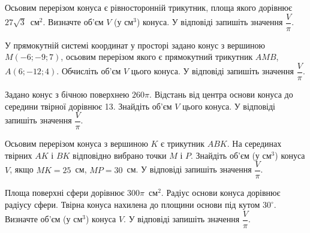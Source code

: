 \documentclass[12pt]{article}
\begin{document}
\begin{samepage}
\noindent\zadnum Осьовим перерізом конуса є рівносторонній трикутник, площа якого дорівнює $27\sqrt{3}$~см$^2$. Визначте об’єм $V$ (у см$^3$) конуса. У відповіді запишіть значення $\dfrac{V}{\pi}$. 

\nmtnobreak
\nopagebreak\nbvspace{0.5cm}
\nmtAnswerBox
\par{}
\end{samepage}

\begin{samepage}
\noindent\zadnum У прямокутній системі координат у просторі задано конус з вершиною $M(-6; -9; 7)$, осьовим перерізом якого є прямокутний трикутник $AMB$, $A(6; -12; 4)$. Обчисліть об’єм $V$ цього конуса. У відповіді запишіть значення $\dfrac{V}{\pi}$. 

\nmtnobreak
\nopagebreak\nbvspace{0.5cm}
\nmtAnswerBox
\par{}
\end{samepage}

\begin{samepage}
\noindent\zadnum Задано конус з бічною поверхнею $260\pi$. Відстань від центра основи конуса до середини твірної дорівнює 13. Знайдіть об'єм $V$ цього конуса. У відповіді запишіть значення $\dfrac{V}{\pi}$. 

\nmtnobreak
\nopagebreak\nbvspace{0.5cm}
\nmtAnswerBox
\par{}
\end{samepage}

\begin{samepage}
\noindent\zadnum Осьовим перерізом конуса з вершиною $K$ є трикутник $ABK$. На серединах твірних $AK$ і $BK$ відповідно вибрано точки $M$ і $P$. Знайдіть об'єм (у см$^3$) конуса $V$, якщо $MK=25$~см, $MP=30$~см. У відповіді запишіть значення $\dfrac{V}{\pi}$. 

\nmtnobreak
\nopagebreak\nbvspace{0.5cm}
\nmtAnswerBox
\par{}
\end{samepage}

\begin{samepage}
\noindent\zadnum Площа поверхні сфери дорівнює $300\pi$~см$^2$. Радіус основи конуса дорівнює радіусу сфери. Твірна конуса нахилена до площини основи під кутом $30^\circ$. Визначте об'єм (у см$^3$) конуса $V$. У відповіді запишіть значення $\dfrac{V}{\pi}$. 

\nmtnobreak
\nopagebreak\nbvspace{0.5cm}
\nmtAnswerBox
\par{}
\end{samepage}
\end{document}

